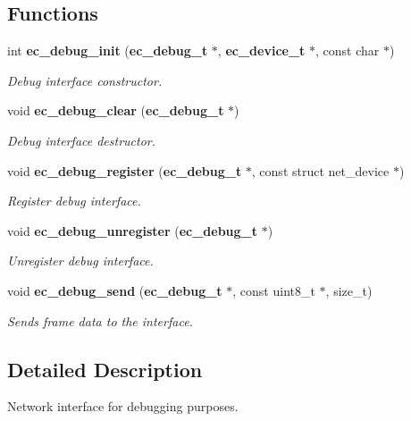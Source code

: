 \subsection*{\-Functions}
\begin{DoxyCompactItemize}
\item 
int {\bf ec\-\_\-debug\-\_\-init} ({\bf ec\-\_\-debug\-\_\-t} $\ast$, {\bf ec\-\_\-device\-\_\-t} $\ast$, const char $\ast$)
\begin{DoxyCompactList}\small\item\em \-Debug interface constructor. \end{DoxyCompactList}\item 
void {\bf ec\-\_\-debug\-\_\-clear} ({\bf ec\-\_\-debug\-\_\-t} $\ast$)
\begin{DoxyCompactList}\small\item\em \-Debug interface destructor. \end{DoxyCompactList}\item 
void {\bf ec\-\_\-debug\-\_\-register} ({\bf ec\-\_\-debug\-\_\-t} $\ast$, const struct net\-\_\-device $\ast$)\label{debug_8h_a1d9b504f3765f22ec81c6e332f542add}

\begin{DoxyCompactList}\small\item\em \-Register debug interface. \end{DoxyCompactList}\item 
void {\bf ec\-\_\-debug\-\_\-unregister} ({\bf ec\-\_\-debug\-\_\-t} $\ast$)\label{debug_8h_aed729c6112e274fb57539f57f0101c59}

\begin{DoxyCompactList}\small\item\em \-Unregister debug interface. \end{DoxyCompactList}\item 
void {\bf ec\-\_\-debug\-\_\-send} ({\bf ec\-\_\-debug\-\_\-t} $\ast$, const uint8\-\_\-t $\ast$, size\-\_\-t)\label{debug_8h_a69e2cddd7db5ff1ac8b3e1896e7cc862}

\begin{DoxyCompactList}\small\item\em \-Sends frame data to the interface. \end{DoxyCompactList}\end{DoxyCompactItemize}


\subsection{\-Detailed \-Description}
\-Network interface for debugging purposes. 

